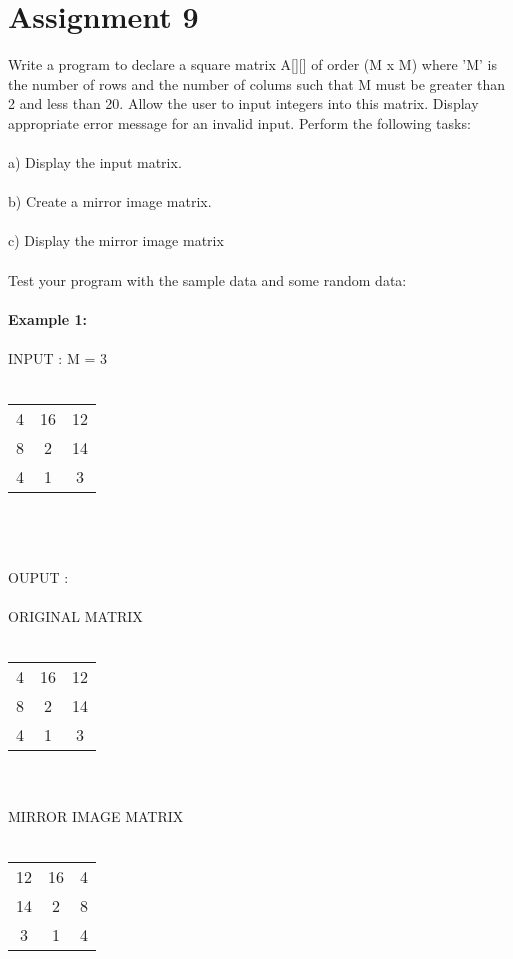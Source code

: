 \section*{\centering Assignment 9}
\vspace{15px}
Write a program to declare a square matrix A[][] of order (M x M) where 'M'
is the number of rows and the number of colums such that M must be greater 
than 2 and less than 20. Allow the user to input integers into this matrix.
Display appropriate error message for an invalid input. Perform the following
tasks:\\\\
a) Display the input matrix.\\\\
b) Create a mirror image matrix.\\\\
c) Display the mirror image matrix\\\\
Test your program with the sample data and some random data:\\\\
\textbf{Example 1:}\\\\
INPUT	:	M = 3\\\\
\begin{tabular}{ccc}
	4 & 16 & 12 \\
	8 & 2 & 14 \\
	4 & 1 & 3 \\
\end{tabular}\\\\\\
OUPUT	:\\\\
ORIGINAL MATRIX\\\\
\begin{tabular}{ccc}
	4 & 16 & 12 \\
	8 & 2 & 14 \\
	4 & 1 & 3 \\
\end{tabular}\\\\
MIRROR IMAGE MATRIX\\\\
\begin{tabular}{ccc}
	12 & 16 & 4 \\
	14 & 2 & 8 \\
	3 & 1 & 4 \\
\end{tabular}

